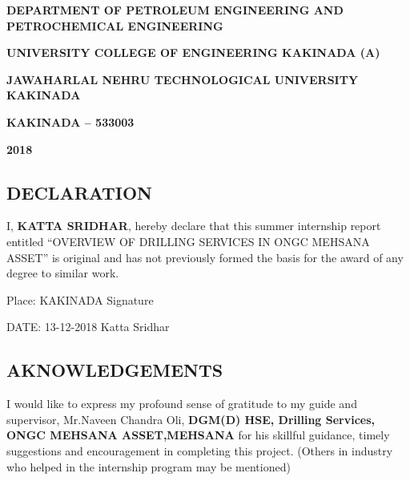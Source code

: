 \documentclass[11pt,a4paper]{report}
\begin{document}
\begin{titlepage}
\begin{center}
\vspace{1em}

\doublespacing

\large \textbf{DEPARTMENT OF PETROLEUM ENGINEERING AND \\ 
PETROCHEMICAL ENGINEERING}

\large \textbf{UNIVERSITY COLLEGE OF ENGINEERING KAKINADA (A)}

\large \textbf{JAWAHARLAL NEHRU TECHNOLOGICAL UNIVERSITY KAKINADA}

\large \textbf{KAKINADA – 533003}

\large \textbf{2018}

\end{center}
\end{titlepage}

\newpage

\begin{center}
\section*{DECLARATION}
\end{center}

\vspace{4em}


I, \textbf{KATTA SRIDHAR}, hereby declare that this summer internship report entitled “OVERVIEW OF DRILLING SERVICES IN ONGC MEHSANA ASSET” is original and has not previously formed the basis for the award of any degree to similar work.


\vspace{5em}

\noindent Place: KAKINADA  \hfill Signature     \hspace{0.02\textwidth}

\vspace{1em}

\noindent DATE: 13-12-2018  \hfill Katta Sridhar


\newpage

\begin{center}
\section*{AKNOWLEDGEMENTS}
\end{center}


\vspace{1em}

I would like to express my profound sense of gratitude to my guide and supervisor, Mr.Naveen Chandra Oli, \textbf{DGM(D) HSE, Drilling Services, ONGC MEHSANA ASSET,MEHSANA} for his skillful guidance, timely suggestions and encouragement in completing this project. (Others in industry who helped in the internship program may be mentioned)
\end{document}
